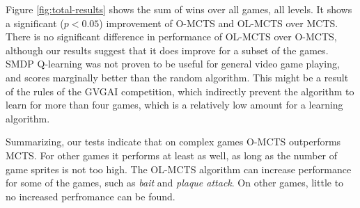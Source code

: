 Figure \ref{fig:total-results} shows the sum of wins over all games, all levels.
It shows a significant ($p < 0.05$) improvement of O-MCTS and OL-MCTS over MCTS.
There is no significant difference in performance of OL-MCTS over O-MCTS,
although our results suggest that it does improve for a subset of the games.
SMDP Q-learning was not proven to be useful for general video game playing, and
scores marginally better than the random algorithm. This might be a result of
the rules of the GVGAI competition, which indirectly prevent the algorithm to
learn for more than four games, which is a relatively low amount for a learning
algorithm.

Summarizing, our tests indicate that on complex games O-MCTS outperforms MCTS.
For other games it performs at least as well, as long as the number of game
sprites is not too high.  The OL-MCTS algorithm can increase performance for
some of the games, such as \textit{bait} and \textit{plaque attack}. On other
games, little to no increased perfromance can be found. 

